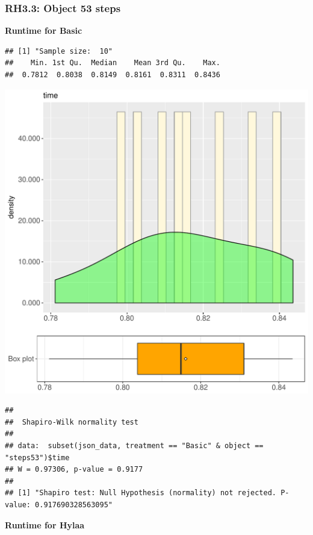 \documentclass{article}\usepackage[]{graphicx}\usepackage[]{color}
\makeatletter
\def\maxwidth{ %
  \ifdim\Gin@nat@width>\linewidth
    \linewidth
  \else
    \Gin@nat@width
  \fi
}
\newenvironment{kframe}{%
 \def\at@end@of@kframe{}%
 \ifinner\ifhmode%
  \def\at@end@of@kframe{\end{minipage}}%
  \begin{minipage}{\columnwidth}%
 \fi\fi%
 \def\FrameCommand##1{\hskip\@totalleftmargin \hskip-\fboxsep
 \colorbox{shadecolor}{##1}\hskip-\fboxsep
     \hskip-\linewidth \hskip-\@totalleftmargin \hskip\columnwidth}%
 \MakeFramed {\advance\hsize-\width
   \@totalleftmargin\z@ \linewidth\hsize
   \@setminipage}}%
 {\par\unskip\endMakeFramed%
 \at@end@of@kframe}
\newenvironment{knitrout}{}{} %
\makeatother
\begin{document}
\subsubsection{RH3.3: Object 53 steps}

 \textbf{Runtime for Basic}
\begin{knitrout}
\color{fgcolor}\begin{kframe}
\begin{verbatim}
## [1] "Sample size:  10"
##    Min. 1st Qu.  Median    Mean 3rd Qu.    Max. 
##  0.7812  0.8038  0.8149  0.8161  0.8311  0.8436
\end{verbatim}
\end{kframe}
\includegraphics[width=\maxwidth]{figure/RH3_Basic_steps53-1} 
\begin{kframe}\begin{verbatim}
## 
## 	Shapiro-Wilk normality test
## 
## data:  subset(json_data, treatment == "Basic" & object == "steps53")$time
## W = 0.97306, p-value = 0.9177
## 
## [1] "Shapiro test: Null Hypothesis (normality) not rejected. P-value: 0.917690328563095"
\end{verbatim}
\end{kframe}
\end{knitrout}
 \textbf{Runtime for Hylaa}
\end{document}
